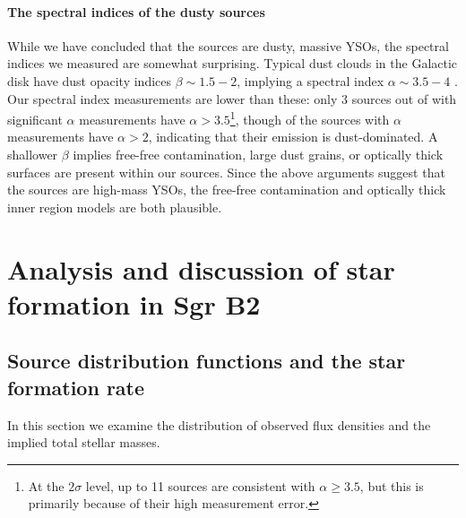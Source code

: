 \documentclass[twocolumn]{aastex61}
\begin{document}
\paragraph{The spectral indices of the dusty sources}
While we have concluded that the sources are dusty, massive YSOs, the
spectral indices we measured are somewhat surprising.  Typical dust clouds in
the Galactic disk have dust opacity indices $\beta\sim1.5-2$, implying 
a spectral index $\alpha\sim3.5-4$
\citep[$\beta=\alpha-2$;][]{Schnee2010a,Shirley2011a,Sadavoy2016a}.  Our spectral index measurements
are lower
than these:  only 3 sources out of \nalphas with significant $\alpha$
measurements have $\alpha > 3.5$\footnote{At the
$2\sigma$ level, up to 11 sources are consistent with $\alpha\geq3.5$, but this is
primarily because of their high measurement error.}, though \ngttwo of the
sources with $\alpha$ measurements have $\alpha>2$, indicating that their
emission is dust-dominated.  A shallower $\beta$ implies free-free
contamination, large dust grains, or optically thick surfaces are present
within our sources.  Since the above arguments suggest that the sources are
high-mass YSOs, the free-free contamination and optically
thick inner region models are both plausible.

\section{Analysis and discussion of star formation in Sgr B2}
\label{sec:sfdiscussion}
\subsection{Source distribution functions and the star formation rate}
\label{sec:distributionsandsfr}

In this section we examine the distribution of observed flux densities and the
implied total stellar masses.  

\end{document}
